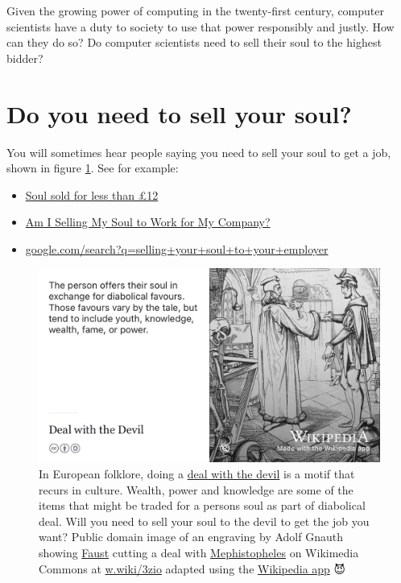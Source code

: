 \documentclass[
]{book}
\providecommand{\tightlist}{%
  \setlength{\itemsep}{0pt}\setlength{\parskip}{0pt}}
\begin{document}
Given the growing power of computing in the twenty-first century, computer scientists have a duty to society to use that power responsibly and justly. How can they do so? Do computer scientists need to sell their soul to the highest bidder?

\hypertarget{soul}{%
\section{Do you need to sell your soul?}\label{soul}}

You will sometimes hear people saying you need to sell your soul to get a job, shown in figure \ref{fig:diabolical-fig}. See for example:

\begin{itemize}
\tightlist
\item
  \href{http://news.bbc.co.uk/1/hi/england/2051061.stm}{Soul sold for less than £12} \citep{bbcsoul}
\item
  \href{https://www.thevectorimpact.com/selling-your-soul/}{Am I Selling My Soul to Work for My Company?} \citep{sellmysoul}
\item
  \href{https://www.google.com/search?q=selling+your+soul+to+your+employer}{google.com/search?q=selling+your+soul+to+your+employer}
\end{itemize}

\begin{figure}

{\centering \includegraphics[width=1\linewidth]{images/deal-with-the-devil} 

}

\caption{In European folklore, doing a \href{https://en.wikipedia.org/wiki/Deal_with_the_Devil}{deal with the devil} is a motif that recurs in culture. Wealth, power and knowledge are some of the items that might be traded for a persons soul as part of diabolical deal. Will you need to sell your soul to the devil to get the job you want? Public domain image of an engraving by Adolf Gnauth showing \href{https://en.wikipedia.org/wiki/Faust}{Faust} cutting a deal with \href{https://en.wikipedia.org/wiki/Mephistopheles}{Mephistopheles} on Wikimedia Commons at \href{https://w.wiki/3zio}{w.wiki/3zio} adapted using the \href{https://apps.apple.com/gb/app/wikipedia/id324715238}{Wikipedia app} 😈}\label{fig:diabolical-fig}
\end{figure}
\end{document}
